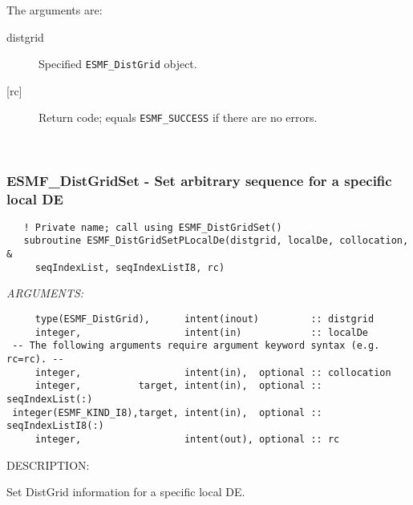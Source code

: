        The arguments are:
       \begin{description}
       \item[distgrid] 
            Specified {\tt ESMF\_DistGrid} object.
       \item[{[rc]}] 
            Return code; equals {\tt ESMF\_SUCCESS} if there are no errors.
       \end{description}
   
 
\mbox{}\hrulefill\ 
 
\subsubsection [ESMF\_DistGridSet] {ESMF\_DistGridSet - Set arbitrary sequence for a specific local DE}


 
\begin{verbatim}   ! Private name; call using ESMF_DistGridSet()
   subroutine ESMF_DistGridSetPLocalDe(distgrid, localDe, collocation, &
     seqIndexList, seqIndexListI8, rc)\end{verbatim}{\em ARGUMENTS:}
\begin{verbatim}     type(ESMF_DistGrid),      intent(inout)         :: distgrid
     integer,                  intent(in)            :: localDe
 -- The following arguments require argument keyword syntax (e.g. rc=rc). --
     integer,                  intent(in),  optional :: collocation
     integer,          target, intent(in),  optional :: seqIndexList(:)
 integer(ESMF_KIND_I8),target, intent(in),  optional :: seqIndexListI8(:)
     integer,                  intent(out), optional :: rc
           \end{verbatim}
{\sf DESCRIPTION:\\ }


     Set DistGrid information for a specific local DE.
  
